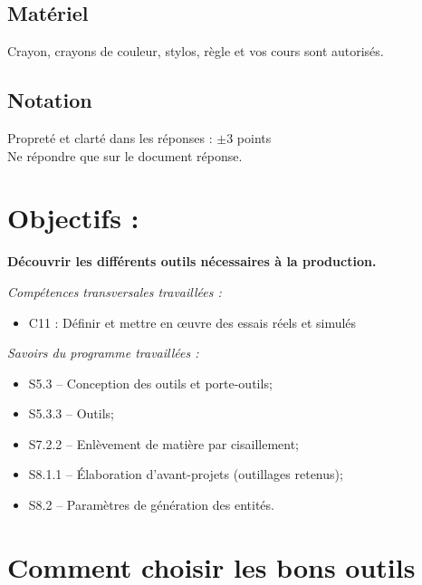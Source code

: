 \documentclass[12pt]{article}
\begin{document}
\subsection{Matériel}

Crayon, crayons de couleur, stylos, règle et vos cours sont autorisés.

\subsection{Notation}
\noindent
Propreté et clarté dans les réponses : $\pm$3 points\\
Ne répondre que sur le document réponse.\\


\section{Objectifs :}
\begin{center}
\textbf{Découvrir les différents outils nécessaires à la production.}\\
\end{center}

\begin{minipage}[t]{.55\linewidth}
\textit{Compétences transversales travaillées :}
\begin{itemize}
    \item C11 : Définir et mettre en œuvre des essais réels et simulés
\end{itemize}

\end{minipage}
\begin{minipage}[t]{.44\linewidth}
\textit{Savoirs du programme travaillées :}
\begin{itemize}
    \item S5.3 – Conception des outils et porte-outils;
    \item S5.3.3 – Outils;
    \item S7.2.2 – Enlèvement de matière par cisaillement;
    \item S8.1.1 – Élaboration d’avant-projets (outillages retenus);
    \item S8.2 – Paramètres de génération des entités.
\end{itemize}
\end{minipage}

\section{Comment choisir les bons outils}
\end{document}
